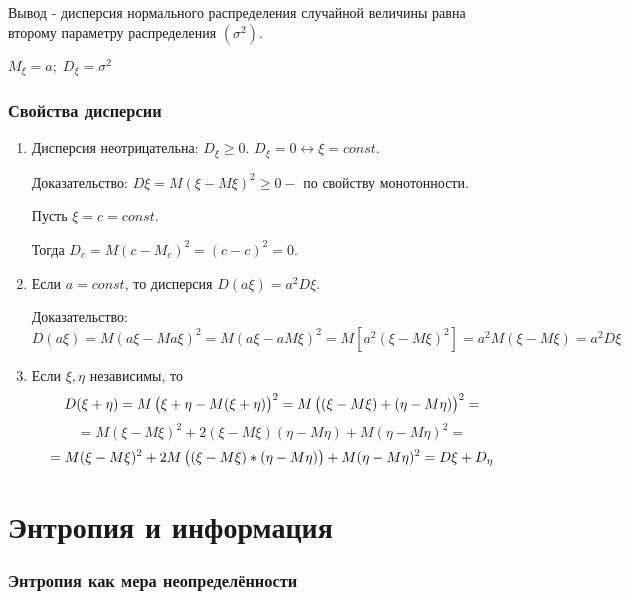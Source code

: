 ﻿\documentclass[a4paper,12pt]{report}
\begin{document}
	 Вывод - дисперсия нормального распределения случайной величины равна второму параметру распределения $(\sigma^2)$. 
 
	$M_\xi = a; \; D_\xi = \sigma^2$

	


	
	\subsubsection{Свойства дисперсии}


	\begin{enumerate}

	\item	Дисперсия неотрицательна: $D_\xi \ge 0.$ $D_\xi = 0 \longleftrightarrow \xi = const$. 
		
		Доказательство: $D\xi = M(\xi-M\xi)^2 \ge 0 - $ по свойству монотонности.
		
		Пусть $\xi = c = const$.
		
		Тогда $D_c = M(c-M_c)^2 =(c - c)^2 = 0$.


	\item	Если $a = const$, то дисперсия $D(a\xi) = a^2 D\xi$. 
	
		Доказательство: 
		$D(a\xi) = M(a\xi - Ma\xi)^2
		         = M(a\xi - a M\xi)^2
		         = M[a^2 (\xi-M\xi)^2]
		         = a^2 M(\xi - M\xi)
		         = a^2 D\xi
		$
		

	\item	Если $\xi,\eta$ независимы, то 
		$$
		  D(\xi + \eta) = M\left(  \xi \strut + \eta - M(\xi +\eta)    \right)^2 
		                = M\left( (\xi - M\xi) \strut + (\eta - M\eta) \right)^2
		                =
		$$ $$		                
		                = M(\xi - M\xi)^2 + 2(\xi-M\xi)(\eta - M\eta) + M(\eta - M\eta)^2
		                =
		$$ $$
		                = M(\xi - M\xi)^2 + 2M\left( (\xi - M\xi) \strut * (\eta - M\eta)\right) 
		                  + M(\eta - M\eta)^2
		                = D\xi + D_\eta
		$$
	
	\end{enumerate}
	
	
	
	

\section{Энтропия и информация}

\subsubsection{Энтропия как мера неопределённости}
\end{document}

